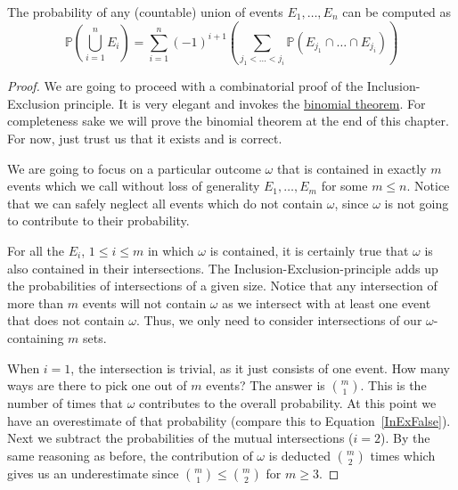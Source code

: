 \documentclass[a4paper,11pt,leqno]{report}
\begin{document}
\begin{Theorem}
The probability of any (countable) union of events $ E_{1}, \ldots, E_{n} $ can be computed as \\
\begin{equation}\label{eq:incexc} \mathbb{P} \left( \underset{i=1}{\overset{n}{\bigcup}} E_{i} \right) 
= \underset{i=1}{\overset{n}{\sum}} (-1)^{i+1} \left( \underset{j_{1}<\ldots<j_{i}}{\sum} 
\mathbb{P} \left(E_{j_{1}} \cap \ldots \cap E_{j_{i}} \right) \right)
\end{equation}
\end{Theorem}

\begin{proof}
We are going to proceed with a combinatorial proof of the Inclusion-Exclusion principle. It is
very elegant and invokes the \href{https://en.wikipedia.org/wiki/Binomial_theorem}{binomial theorem}. 
For completeness sake we will prove the binomial theorem
at the end of this chapter. For now, just trust us that it exists and is correct.

We are going to focus on a particular outcome $ \omega $ that is contained in exactly $ m $ events which we call without loss of generality  $ E_{1}, \ldots, E_{m} $ for some $m\leq n$. Notice that we can safely neglect all events which do not contain
$ \omega $, since $ \omega $ is not going to contribute to their probability. 

For all the $ E_{i} $, $ 1 \leq i \leq m $ in which $ \omega $ is contained, it is certainly true
that $ \omega $ is also contained in their intersections. The Inclusion-Exclusion-principle
adds up the probabilities of intersections of a given size. Notice that any intersection of more
than $ m $ events will not contain $ \omega $ as we intersect with at least one event that does not
contain $ \omega $. Thus, we only need to consider intersections of our $ \omega $-containing $ m $
sets.

When $i=1$, the intersection is trivial, as it just consists of one event. How many ways are there to pick
one out of $ m $ events? The answer is $ \binom{m}{1} $. This is the number of times that $ \omega $
contributes to the overall probability. At this point we have an overestimate of that probability 
(compare this to Equation~\eqref{InExFalse}). Next we subtract the probabilities of the mutual intersections ($i=2$).
By the same reasoning as before, the contribution of $ \omega $ is deducted $ \binom{m}{2} $ times
which gives us an underestimate since $ \binom{m}{1} \leq \binom{m}{2} $ for $ m \geq 3 $.


\end{proof}
\end{document}
